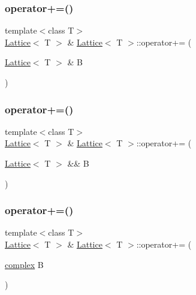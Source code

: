 \subsubsection{\texorpdfstring{operator+=()}{operator+=()}\hspace{0.1cm}{\footnotesize\ttfamily [1/3]}}
{\footnotesize\ttfamily template$<$class T$>$ \\
\mbox{\hyperlink{class_lattice}{Lattice}}$<$ T $>$ \& \mbox{\hyperlink{class_lattice}{Lattice}}$<$ T $>$\+::operator+= (\begin{DoxyParamCaption}\item[{\mbox{\hyperlink{class_lattice}{Lattice}}$<$ T $>$ \&}]{B }\end{DoxyParamCaption})\hspace{0.3cm}{\ttfamily [inline]}}

\mbox{\label{class_lattice_a83e9265a5da00384a19dc47eff5f9e00}} 
\subsubsection{\texorpdfstring{operator+=()}{operator+=()}\hspace{0.1cm}{\footnotesize\ttfamily [2/3]}}
{\footnotesize\ttfamily template$<$class T$>$ \\
\mbox{\hyperlink{class_lattice}{Lattice}}$<$ T $>$ \& \mbox{\hyperlink{class_lattice}{Lattice}}$<$ T $>$\+::operator+= (\begin{DoxyParamCaption}\item[{\mbox{\hyperlink{class_lattice}{Lattice}}$<$ T $>$ \&\&}]{B }\end{DoxyParamCaption})\hspace{0.3cm}{\ttfamily [inline]}}

\mbox{\label{class_lattice_ab94a46cade378e4daa689e2ddcf61ff3}} 
\subsubsection{\texorpdfstring{operator+=()}{operator+=()}\hspace{0.1cm}{\footnotesize\ttfamily [3/3]}}
{\footnotesize\ttfamily template$<$class T$>$ \\
\mbox{\hyperlink{class_lattice}{Lattice}}$<$ T $>$ \& \mbox{\hyperlink{class_lattice}{Lattice}}$<$ T $>$\+::operator+= (\begin{DoxyParamCaption}\item[{\mbox{\hyperlink{classcomplex}{complex}}}]{B }\end{DoxyParamCaption})\hspace{0.3cm}{\ttfamily [inline]}}

